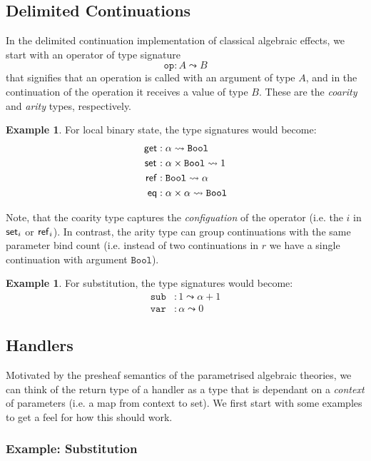 \documentclass{scrartcl}
\theoremstyle{definition}
\newtheorem{example}[theorem]{Example}
\newcommand{\op}{\mathtt{op}}
\newcommand{\Bool}{\mathtt{Bool}}
\newcommand{\sub}{\mathtt{sub}}
\newcommand{\var}{\mathtt{var}}
\begin{document}
\subsection{Delimited Continuations}

In the delimited continuation implementation of classical algebraic effects, we start with an operator of type signature
\[
    \op: A \leadsto B
\]
that signifies that an operation is called with an argument of type $A$, and in the continuation of the operation it receives a value of type $B$.
These are the \emph{coarity} and \emph{arity} types, respectively.

\begin{example}
For local binary state, the type signatures would become:
\begin{align*}
    \get &: \alpha \leadsto \Bool \\
    \set{} &: \alpha \times \Bool \leadsto 1 \\
    \rf  &: \Bool \leadsto \alpha \\
    \eq  &: \alpha \times \alpha \leadsto \Bool
\end{align*}
\end{example}

Note, that the coarity type captures the \emph{configuation} of the operator (i.e. the $i$ in $\mathsf{set}_{i}$ or $\mathsf{ref}_i$).
In contrast, the arity type can group continuations with the same parameter bind count (i.e. instead of two continuations in $r$ we have a single continuation with argument $\Bool$).

\begin{example}
For substitution, the type signatures would become:
\begin{align*}
    \sub &: 1 \leadsto \alpha + 1 \\
    \var &: \alpha \leadsto 0
\end{align*}
\end{example}

\subsection{Handlers}

Motivated by the presheaf semantics of the parametrised algebraic theories, we can think of the return type of a handler as a type that is dependant on a \emph{context} of parameters (i.e. a map from context to set). We first start with some examples to get a feel for how this should work.

\subsubsection{Example: Substitution}
\end{document}
